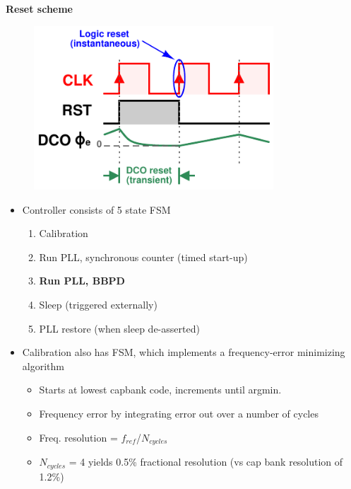 			\textbf{\hspace{3em}Reset scheme}
			\begin{figure}[htb!]
			        \centering
			        \includegraphics[width=0.8\textwidth, angle=0]{./figs/pll_reset}
			\end{figure}



			\begin{itemize}[itemsep=4pt,label=\protect---]
			        \item Controller consists of 5 state FSM
					\begin{enumerate}[itemsep=4pt,label=\arabic*]
						\item Calibration
						\item Run PLL, synchronous counter (timed start-up)
						\item \textbf{Run PLL, BBPD} 
						\item Sleep (triggered externally)
						\item PLL restore (when sleep de-asserted)
					\end{enumerate}
					\item Calibration also has FSM, which implements a frequency-error minimizing algorithm 
					\begin{itemize}[itemsep=4pt,label=$\bullet$]
						\item Starts at lowest capbank code, increments until argmin.
						\item Frequency error by integrating error out over a number of cycles
						\item Freq. resolution = $f_{ref}$/$N_{cycles}$
						\item $N_{cycles}$ = 4 yields 0.5\% fractional resolution (vs cap bank resolution of 1.2\%)
					\end{itemize}
			\end{itemize}


